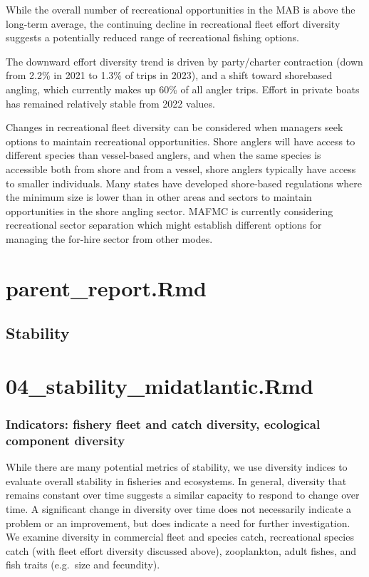 \documentclass[
  10pt,
]{article}
\begin{document}
While the overall number of recreational opportunities in the MAB is above the long-term average, the continuing decline in recreational fleet effort diversity suggests a potentially reduced range of recreational fishing options.

The downward effort diversity trend is driven by party/charter contraction (down from 2.2\% in 2021 to 1.3\% of trips in 2023), and a shift toward shorebased angling, which currently makes up 60\% of all angler trips. Effort in private boats has remained relatively stable from 2022 values.

Changes in recreational fleet diversity can be considered when managers seek options to maintain recreational opportunities. Shore anglers will have access to different species than vessel-based anglers, and when the same species is accessible both from shore and from a vessel, shore anglers typically have access to smaller individuals. Many states have developed shore-based regulations where the minimum size is lower than in other areas and sectors to maintain opportunities in the shore angling sector. MAFMC is currently considering recreational sector separation which might establish different options for managing the for-hire sector from other modes.

\section{parent\_report.Rmd}\label{parent_report.rmd-3}

\subsection{Stability}\label{stability}

\section{04\_stability\_midatlantic.Rmd}\label{stability_midatlantic.rmd}

\subsubsection{Indicators: fishery fleet and catch diversity, ecological component diversity}\label{indicators-fishery-fleet-and-catch-diversity-ecological-component-diversity}

While there are many potential metrics of stability, we use diversity indices to evaluate overall stability in fisheries and ecosystems. In general, diversity that remains constant over time suggests a similar capacity to respond to change over time. A significant change in diversity over time does not necessarily indicate a problem or an improvement, but does indicate a need for further investigation. We examine diversity in commercial fleet and species catch, recreational species catch (with fleet effort diversity discussed above), zooplankton, adult fishes, and fish traits (e.g.~size and fecundity).
\end{document}
